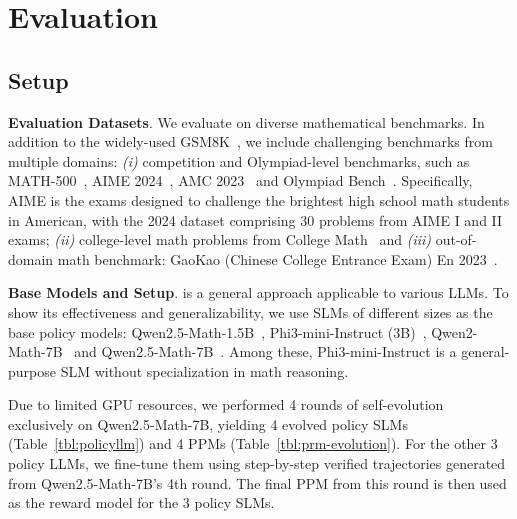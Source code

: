 

\section{Evaluation}
\subsection{Setup}

\noindent\textbf{Evaluation Datasets}. We evaluate {\sysname} on diverse  mathematical benchmarks.  In addition to the widely-used  GSM8K~\citep{gsm8k}, we include challenging benchmarks from multiple domains: \textit{(i)} competition and Olympiad-level benchmarks, such as MATH-500~\citep{lightman2023let}, AIME 2024~\citep{aime}, AMC 2023~\citep{amc} and Olympiad Bench~\citep{he2024olympiadbench}. Specifically,  AIME is the exams designed to challenge the brightest high school math students in American, with the 2024 dataset comprising 30 problems from AIME I and II exams; 
\textit{(ii)} college-level math problems from College Math~\citep{mathscale} and \textit{(iii)} out-of-domain math benchmark: GaoKao (Chinese
College Entrance Exam) En 2023~\citep{liao2024mario}. 






\noindent\textbf{Base Models and Setup}. {\sysname} is a general approach applicable to various LLMs. To show its effectiveness and generalizability, we use SLMs of different sizes as the base policy models:  
Qwen2.5-Math-1.5B~\citep{qwen2.5-math-1.5b}, Phi3-mini-Instruct (3B)~\citep{phi3-4k,phi3}, Qwen2-Math-7B~\citep{qwen2-math-7b} and Qwen2.5-Math-7B~\citep{qwen2.5-math-7b}. Among these, Phi3-mini-Instruct is a general-purpose SLM without specialization in math reasoning. 

Due to limited GPU resources, we performed 4 rounds of self-evolution exclusively on Qwen2.5-Math-7B, yielding 4 evolved policy SLMs (Table~\ref{tbl:policyllm}) and 4 PPMs (Table~\ref{tbl:prm-evolution}). For the other 3 policy LLMs, we fine-tune them using step-by-step verified trajectories generated from  Qwen2.5-Math-7B's 4th round. The final PPM from this round is then used as the reward model for the 3 policy SLMs. 








